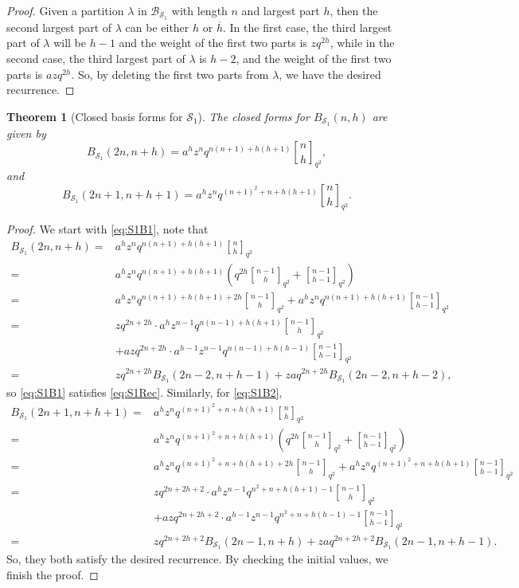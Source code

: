 \documentclass[10pt,a4paper]{amsart}
\newtheorem{theorem}{Theorem}[section]
\numberwithin{equation}{section}
\begin{document}
\begin{proof}
Given a partition $\lambda$ in $\mathcal{B}_{\mathcal{S}_1}$ with length $n$ and largest part $h$, then the second largest part of $\lambda$ can be either $h$ or $\overline{h}$. In the first case, the third largest part of $\lambda$ will be $h-1$ and the weight of the first two parts is $zq^{2h}$, while in the second case, the third largest part of $\lambda$ is $h-2$, and the weight of the first two parts is $azq^{2h}$. So, by deleting the first two parts from $\lambda$, we have the desired recurrence.
\end{proof}


\begin{theorem}[Closed basis forms for $\mathcal S_1$]\label{thm:S1-closed}
The closed forms for $B_{\mathcal S_1}(n,h)$ are given by
\begin{equation}\label{eq:S1B1}
B_{\mathcal S_1}(2n,n+h)=a^hz^nq^{n(n+1)+h(h+1)}{n\brack h}_{q^2},
\end{equation}
and
\begin{equation}\label{eq:S1B2}
B_{\mathcal S_1}(2n+1,n+h+1)=a^hz^nq^{(n+1)^2+n+h(h+1)}{n\brack h}_{q^2}.
\end{equation}
\end{theorem}

\begin{proof}
We start with \eqref{eq:S1B1}, note that
\begin{align*}
B_{\mathcal S_1}(2n,n+h)=&a^hz^nq^{n(n+1)+h(h+1)}{n\brack h}_{q^2}\\
=&a^hz^nq^{n(n+1)+h(h+1)}\left(q^{2h}{n-1\brack h}_{q^2}+{n-1\brack h-1}_{q^2}\right)\\
=&a^hz^nq^{n(n+1)+h(h+1)+2h}{n-1\brack h}_{q^2}+a^hz^nq^{n(n+1)+h(h+1)}{n-1\brack h-1}_{q^2}\\
=&zq^{2n+2h}\cdot a^hz^{n-1}q^{n(n-1)+h(h+1)}{n-1\brack h}_{q^2}\\
&+azq^{2n+2h}\cdot a^{h-1}z^{n-1}q^{n(n-1)+h(h-1)}{n-1\brack h-1}_{q^2}\\
=&zq^{2n+2h}B_{\mathcal S_1}(2n-2,n+h-1)+zaq^{2n+2h}B_{\mathcal S_1}(2n-2,n+h-2),
\end{align*}
so \eqref{eq:S1B1} satisfies \eqref{eq:S1Rec}. Similarly, for \eqref{eq:S1B2},
\begin{align*}
B_{\mathcal S_1}(2n+1,n+h+1)=&a^hz^nq^{(n+1)^2+n+h(h+1)}{n\brack h}_{q^2}\\
=&a^hz^nq^{(n+1)^2+n+h(h+1)}\left(q^{2h}{n-1\brack h}_{q^2}+{n-1\brack h-1}_{q^2}\right)\\
=&a^hz^nq^{(n+1)^2+n+h(h+1)+2h}{n-1\brack h}_{q^2}+a^hz^nq^{(n+1)^2+n+h(h+1)}{n-1\brack h-1}_{q^2}\\
=&zq^{2n+2h+2}\cdot a^hz^{n-1}q^{n^2+n+h(h+1)-1}{n-1\brack h}_{q^2}\\
&+azq^{2n+2h+2}\cdot a^{h-1}z^{n-1}q^{n^2+n+h(h-1)-1}{n-1\brack h-1}_{q^2}\\
=&zq^{2n+2h+2}B_{\mathcal S_1}(2n-1,n+h)+zaq^{2n+2h+2}B_{\mathcal S_1}(2n-1,n+h-1).
\end{align*}
So, they both satisfy the desired recurrence. By checking the initial values, we finish the proof.
\end{proof}
\end{document}
